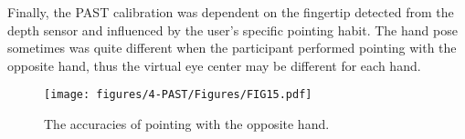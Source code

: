 Finally, the PAST calibration was dependent on the fingertip detected from the depth sensor and influenced by the user's specific pointing habit. The hand pose sometimes was quite different when the participant performed pointing with the opposite hand, thus the virtual eye center may be different for each hand.
\begin{figure} 
	\centering
	\texttt{[image: figures/4-PAST/Figures/FIG15.pdf]}
	\caption{The accuracies of pointing with the opposite hand.}
	\label{fig:anotherHand}
\end{figure}

